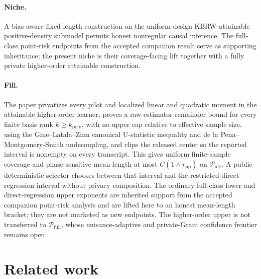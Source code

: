 \documentclass{article}
\begin{document}
\paragraph{Niche.} A bias-aware fixed-length construction on the uniform-design KBRW-attainable positive-density submodel permits honest nonregular causal inference.  The full-class point-risk endpoints from the accepted companion result serve as supporting inheritance; the present niche is their coverage-facing lift together with a fully private higher-order attainable construction.

\paragraph{Fill.} The paper privatizes every pilot and localized linear and quadratic moment in the attainable higher-order learner, proves a raw-estimator remainder bound for every finite basis rank \(k\ge k_{\mathrm{poly}}\), with no upper cap relative to effective sample size, using the Gine--Latala--Zinn canonical U-statistic inequality and de la Pena--Montgomery-Smith undecoupling, and clips the released center so the reported interval is nonempty on every transcript.  This gives uniform finite-sample coverage and phase-sensitive mean length at most \(C(1\wedge r_{\mathrm{up}})\) on \(\mathcal P_{\mathrm{att}}\).  A public deterministic selector chooses between that interval and the restricted direct-regression interval without privacy composition.  The ordinary full-class lower and direct-regression upper exponents are inherited support from the accepted companion point-risk analysis and are lifted here to an honest mean-length bracket; they are not marketed as new endpoints.  The higher-order upper is not transferred to \(\mathcal P_{\mathrm{full}}\), whose nuisance-adaptive and private-Gram confidence frontier remains open.

\section{Related work}
\end{document}
